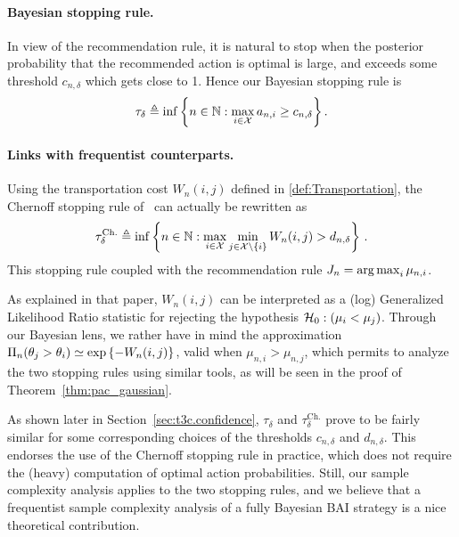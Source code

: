 \paragraph{Bayesian stopping rule.}
In view of the recommendation rule, it is natural to stop when the posterior probability that the recommended action is optimal is large, and exceeds some threshold $c_{n,\delta}$ which gets close to 1. Hence our Bayesian stopping rule is \begin{equation}\label{eq:stopping}
    \tau_{\delta} \triangleq \inf \left\{ n\in{\mathbb N}:\max_{i\in\mathcal{X}} a_{n,i} \geq c_{n,\delta} \right\}.
\end{equation}

\paragraph{Links with frequentist counterparts.} 
Using the transportation cost $W_n(i,j)$ defined in \eqref{def:Transportation}, the Chernoff stopping rule of~\cite{garivier2016tracknstop} can actually be rewritten as
\begin{equation}\label{eq:chernoffstoppingtime}
    \tau_\delta^{\text{Ch.}} \triangleq \inf \left\lbrace n \in {\mathbb N} : \max_{i \in \mathcal{X}} \min_{j \in \mathcal{X} \setminus \{i\} } W_{n}(i,j) > d_{n,\delta} \right\rbrace\,.
\end{equation}
This stopping rule coupled with the recommendation rule $J_n = \operatorname*{arg\,max}_{i} \mu_{n,i}$. 

As explained in that paper, $W_{n}(i,j)$ can be interpreted as a (log) Generalized Likelihood Ratio statistic for rejecting the hypothesis $\mathcal{H}_0 : (\mu_i < \mu_j)$. Through our Bayesian lens, we rather have in mind the approximation $\Pi_n(\theta_j > \theta_i) \simeq \exp\left\{-W_n(i,j)\right\}$, valid when $\mu_{n,i}> \mu_{n,j}$, which permits to analyze the two stopping rules using similar tools, as will be seen in the proof of Theorem~\ref{thm:pac_gaussian}. 

As shown later in Section~\ref{sec:t3c.confidence}, $\tau_\delta$ and $\tau_\delta^{\text{Ch.}}$ prove to be fairly similar for some corresponding choices of the thresholds $c_{n,\delta}$ and $d_{n,\delta}$. This endorses the use of the Chernoff stopping rule in practice, which does not require the (heavy) computation of optimal action probabilities. Still, our sample complexity analysis applies to the two stopping rules, and we believe that a frequentist sample complexity analysis of a fully Bayesian BAI strategy is a nice theoretical contribution.

